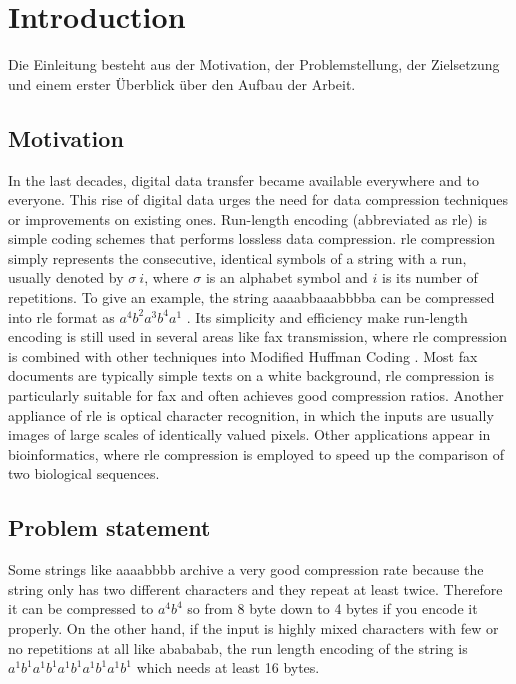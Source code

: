 
\chapter{Introduction}
\label{ch:Introduction}
Die Einleitung besteht aus der Motivation, der Problemstellung, der Zielsetzung und einem erster Überblick über den Aufbau der Arbeit.

\section{Motivation}
\label{ch:Introduction:sec:Motivation}

In the last decades, digital data transfer became available everywhere and to everyone. This rise of digital data urges the need for data compression techniques or improvements on existing ones. Run-length encoding (abbreviated as rle) is simple coding schemes that performs lossless data compression. rle compression simply represents the consecutive, identical symbols of
a string with a run, usually denoted by $\sigma \ i$, where $\sigma$ is an alphabet symbol and $i$ is its number of repetitions. To give an example, the string aaaabbaaabbbba can be compressed into rle format as  $ a^{4}b^{2}a^{3}b^{4}a^{1}$ . Its simplicity and efficiency make run-length encoding is still used in several areas like fax transmission, where rle compression is combined with other techniques into Modified Huffman Coding \cite{fax-rle}. Most fax documents are typically simple texts on a white background, rle compression is particularly suitable for fax and often achieves good compression ratios. Another appliance of rle is optical character recognition, in which the inputs are usually images of large scales of identically valued pixels. Other applications appear in bioinformatics, where rle compression is employed to speed up the comparison of two biological sequences.

\section{Problem statement}
\label{ch:Introduction:sec:Problem statement}
Some strings like aaaabbbb archive a very good compression rate because the string only has two different characters and they repeat at least twice. Therefore it can be compressed to $a^4b^4$ so from 8 byte down to 4 bytes if you encode it properly. On the other hand, if the input is highly mixed characters with few or no repetitions at all like abababab, the run length encoding of the string is $a^1b^1a^1b^1a^1b^1a^1b^1a^1b^1$ which needs at least 16 bytes.\\

